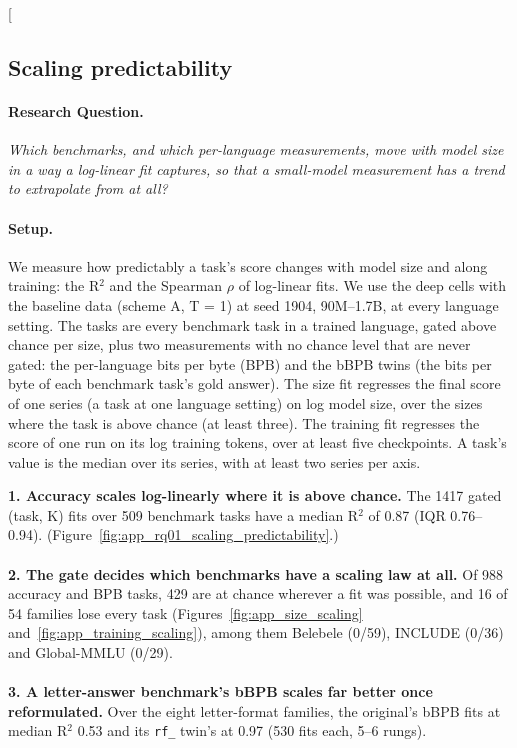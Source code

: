 \clearpage
\twocolumn[{%
\rqparent
\subsection{Scaling predictability}
\label{app:rq01_scaling_predictability}

\noindent\begin{minipage}[t]{0.485\textwidth}
\vspace{0pt}
\paragraph{Research Question.} \emph{Which benchmarks, and which per-language measurements, move with model size in a way a log-linear fit captures, so that a small-model measurement has a trend to extrapolate from at all?}

\paragraph{Setup.} We measure how predictably a task's score changes with model size and along training: the R$^2$ and the Spearman $\rho$ of log-linear fits. We use the deep cells with the baseline data (scheme A, T = 1) at seed 1904, 90M--1.7B, at every language setting. The tasks are every benchmark task in a trained language, gated above chance per size, plus two measurements with no chance level that are never gated: the per-language bits per byte (BPB) and the bBPB twins (the bits per byte of each benchmark task's gold answer). The size fit regresses the final score of one series (a task at one language setting) on log model size, over the sizes where the task is above chance (at least three). The training fit regresses the score of one run on its log training tokens, over at least five checkpoints. A task's value is the median over its series, with at least two series per axis.
\end{minipage}\hfill
\begin{minipage}[t]{0.485\textwidth}
\vspace{0pt}
\begin{rqfinding}
\textbf{1. Accuracy scales log-linearly where it is above chance.} The 1417 gated (task, K) fits over 509 benchmark tasks have a median R$^2$ of 0.87 (IQR 0.76--0.94). (Figure~\ref{fig:app_rq01_scaling_predictability}.)
\\
\\
\textbf{2. The gate decides which benchmarks have a scaling law at all.} Of 988 accuracy and BPB tasks, 429 are at chance wherever a fit was possible, and 16 of 54 families lose every task (Figures~\ref{fig:app_size_scaling} and~\ref{fig:app_training_scaling}), among them Belebele (0/59), INCLUDE (0/36) and Global-MMLU (0/29).
\\
\\
\textbf{3. A letter-answer benchmark's bBPB scales far better once reformulated.} Over the eight letter-format families, the original's bBPB fits at median R$^2$ 0.53 and its \texttt{rf\_} twin's at 0.97 (530 fits each, 5--6 rungs).
\end{rqfinding}
\end{minipage}

}
